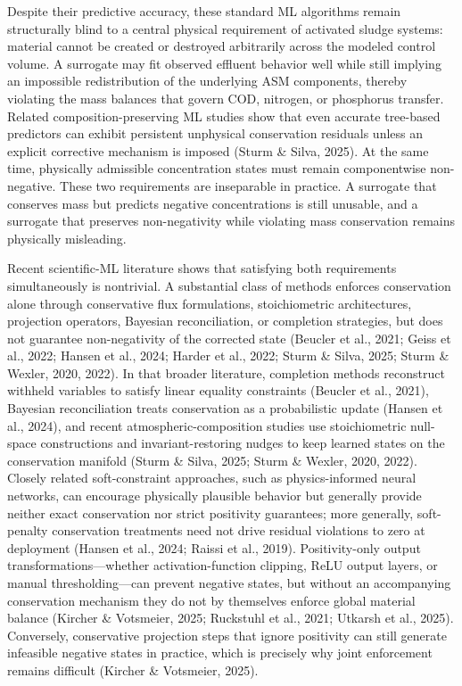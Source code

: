 \documentclass[a4paper,fleqn]{cas-sc}
\newenvironment{revblock}{\begingroup\color{revDefault}}{\endgroup}
\begin{document}
\begin{revblock}
Despite their predictive accuracy, these standard ML algorithms remain structurally blind to a central physical requirement of activated sludge systems: material cannot be created or destroyed arbitrarily across the modeled control volume. A surrogate may fit observed effluent behavior well while still implying an impossible redistribution of the underlying ASM components, thereby violating the mass balances that govern COD, nitrogen, or phosphorus transfer. Related composition-preserving ML studies show that even accurate tree-based predictors can exhibit persistent unphysical conservation residuals unless an explicit corrective mechanism is imposed (Sturm \& Silva, 2025). At the same time, physically admissible concentration states must remain componentwise non-negative. These two requirements are inseparable in practice. A surrogate that conserves mass but predicts negative concentrations is still unusable, and a surrogate that preserves non-negativity while violating mass conservation remains physically misleading.

Recent scientific-ML literature shows that satisfying both requirements simultaneously is nontrivial. A substantial class of methods enforces conservation alone through conservative flux formulations, stoichiometric architectures, projection operators, Bayesian reconciliation, or completion strategies, but does not guarantee non-negativity of the corrected state (Beucler et al., 2021; Geiss et al., 2022; Hansen et al., 2024; Harder et al., 2022; Sturm \& Silva, 2025; Sturm \& Wexler, 2020, 2022). In that broader literature, completion methods reconstruct withheld variables to satisfy linear equality constraints (Beucler et al., 2021), Bayesian reconciliation treats conservation as a probabilistic update (Hansen et al., 2024), and recent atmospheric-composition studies use stoichiometric null-space constructions and invariant-restoring nudges to keep learned states on the conservation manifold (Sturm \& Silva, 2025; Sturm \& Wexler, 2020, 2022). Closely related soft-constraint approaches, such as physics-informed neural networks, can encourage physically plausible behavior but generally provide neither exact conservation nor strict positivity guarantees; more generally, soft-penalty conservation treatments need not drive residual violations to zero at deployment (Hansen et al., 2024; Raissi et al., 2019). Positivity-only output transformations---whether activation-function clipping, ReLU output layers, or manual thresholding---can prevent negative states, but without an accompanying conservation mechanism they do not by themselves enforce global material balance (Kircher \& Votsmeier, 2025; Ruckstuhl et al., 2021; Utkarsh et al., 2025). Conversely, conservative projection steps that ignore positivity can still generate infeasible negative states in practice, which is precisely why joint enforcement remains difficult (Kircher \& Votsmeier, 2025).


\end{revblock}
\end{document}

